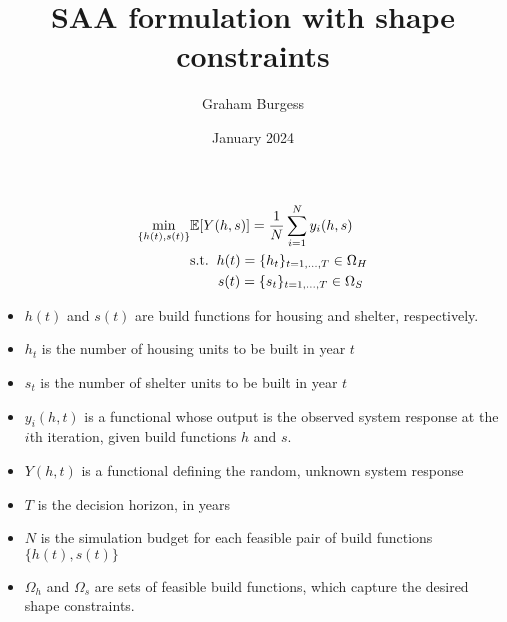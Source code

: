 \documentclass{article}
\title{SAA formulation with shape constraints}
\author{Graham Burgess}
\date{January 2024}
\begin{document}
\maketitle

\begin{align*}
  \min_{\{h(t), s(t)\}} & \mathbb{E} [Y(h,s)] = \frac{1}{N}\sum_{i=1}^{N}y_{i}(h,s) \\
  & \text{s.t.} \hspace{0.2cm} h(t) = \{h_{t}\}_{t=1, ..., T} \in \Omega_{H} \\
  & \hspace{0.7cm} s(t) = \{s_{t}\}_{t=1, ..., T} \in \Omega_{S} \\
\end{align*}

\begin{itemize}
  \item $h(t)$ and $s(t)$ are build functions for housing and shelter, respectively. 
  \item $h_t$ is the number of housing units to be built in year $t$ 
  \item $s_t$ is the number of shelter units to be built in year $t$
  \item $y_i(h,t)$ is a functional whose output is the observed system response at the $i$th iteration, given build functions $h$ and $s$.     
  \item $Y(h,t)$ is a functional defining the random, unknown system response
  \item $T$ is the decision horizon, in years 
  \item $N$ is the simulation budget for each feasible pair of build functions $\{h(t),s(t)\}$
  \item $\Omega_h$ and $\Omega_s$ are sets of feasible build functions, which capture the desired shape constraints. 
\end{itemize}
    
\end{document}

